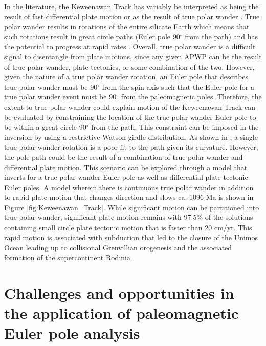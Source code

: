 \documentclass[11pt,letterpaper]{article}
\begin{document}
In the literature, the Keweenawan Track has variably be interpreted as being the result of fast differential plate motion \citep[e.g.][]{Davis1997a} or as the result of true polar wander \citep[e.g.][]{Evans2003b}. True polar wander results in rotations of the entire silicate Earth which means that such rotations result in great circle paths (Euler pole 90$^\circ$ from the path) and has the potential to progress at rapid rates \citep{Rose2017b}. Overall, true polar wander is a difficult signal to disentangle from plate motions, since any given APWP can be the result of true polar wander, plate tectonics, or some combination of the two. However, given the nature of a true polar wander rotation, an Euler pole that describes true polar wander must be 90$^\circ$ from the spin axis such that the Euler pole for a true polar wander event must be 90$^\circ$ from the paleomagnetic poles. Therefore, the extent to true polar wander could explain motion of the Keweenawan Track can be evaluated by constraining the location of the true polar wander Euler pole to be within a great circle 90$^\circ$ from the path. This constraint can be imposed in the inversion by using a restrictive Watson girdle distribution. As shown in \cite{Swanson-Hysell2019a}, a single true polar wander rotation is a poor fit to the path given its curvature. However, the pole path could be the result of a combination of true polar wander and differential plate motion. This scenario can be explored through a model that inverts for a true polar wander Euler pole as well as differential plate tectonic Euler poles. A model wherein there is continuous true polar wander in addition to rapid plate motion that changes direction and slows ca. 1096 Ma is shown in Figure \ref{fig:Keweenawan_Track}. While significant motion can be partitioned into true polar wander, significant plate motion remains with 97.5$\%$ of the solutions containing small circle plate tectonic motion that is faster than 20 cm/yr. This rapid motion is associated with subduction that led to the closure of the Unimos Ocean leading up to collisional Grenvillian orogenesis and the associated formation of the supercontinent Rodinia \citep{Hynes2010a, Swanson-Hysell2022a}.



\section*{Challenges and opportunities in the application of paleomagnetic Euler pole analysis}
\label{sec:challenges_and_opportunities}
\end{document}
